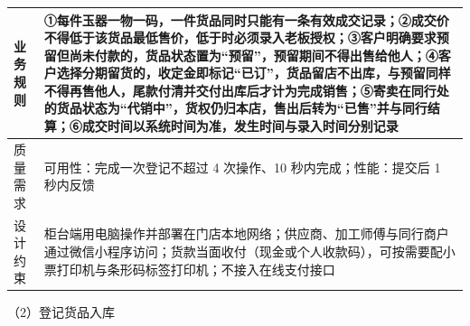 \documentclass[12pt, a4paper]{ctexart}
\begin{document}
{\begin{longtable}{@{}p{2.4cm} p{12.9cm}@{}}
\midrule
业务规则 & ①每件玉器一物一码，一件货品同时只能有一条有效成交记录；\newline ②成交价不得低于该货品最低售价，低于时必须录入老板授权；\newline ③客户明确要求预留但尚未付款的，货品状态置为“预留”，预留期间不得出售给他人；\newline ④客户选择分期留货的，收定金即标记“已订”，货品留店不出库，与预留同样不得再售他人，尾款付清并交付出库后才计为完成销售；\newline ⑤寄卖在同行处的货品状态为“代销中”，货权仍归本店，售出后转为“已售”并与同行结算；\newline ⑥成交时间以系统时间为准，发生时间与录入时间分别记录 \\
\midrule
质量需求 & 可用性：完成一次登记不超过 4 次操作、10 秒内完成；\newline 性能：提交后 1 秒内反馈 \\
\midrule
设计约束 & 柜台端用电脑操作并部署在门店本地网络；供应商、加工师傅与同行商户通过微信小程序访问；货款当面收付（现金或个人收款码），可按需要配小票打印机与条形码标签打印机；不接入在线支付接口 \\
\midrule
\bottomrule
\end{longtable}}
\noindent（2）登记货品入库
\end{document}
